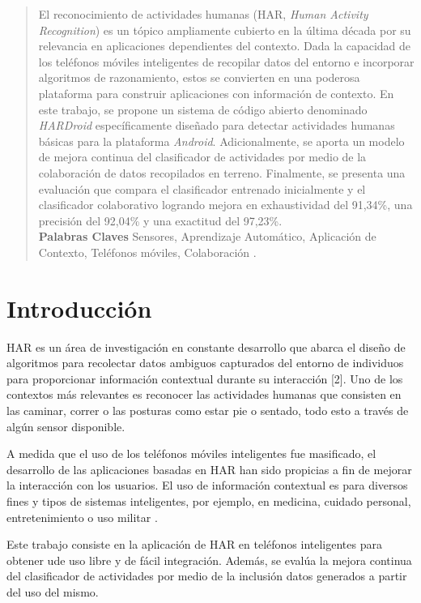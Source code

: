 \documentclass{sciposter}
\begin{document}
\begin{multicols}{3}

\begin{abstract}
El reconocimiento de actividades humanas (HAR, \textit{Human Activity Recognition}) es un tópico ampliamente cubierto en la última década por su relevancia en aplicaciones dependientes del contexto. Dada la capacidad de los teléfonos móviles inteligentes de recopilar datos del entorno e incorporar algoritmos de razonamiento, estos se convierten en una poderosa plataforma para construir aplicaciones con información de contexto. En este trabajo, se propone un sistema de código abierto denominado \textit{HARDroid} específicamente diseñado para detectar actividades humanas básicas para la plataforma \textit{Android}. Adicionalmente, se aporta un modelo de mejora continua del clasificador de actividades por medio de la colaboración de datos recopilados en terreno. Finalmente, se presenta una evaluación que compara el clasificador entrenado inicialmente y el clasificador colaborativo logrando mejora en exhaustividad del 91,34\%, una precisión del 92,04\% y una exactitud del 97,23\%. 
\\
\textbf{Palabras Claves}
Sensores, Aprendizaje Automático, Aplicación de Contexto, Teléfonos móviles, Colaboración .
\end{abstract}

\section{Introducción}

HAR es un área de investigación en constante desarrollo que abarca el diseño de algoritmos para recolectar datos ambiguos capturados del entorno de individuos para proporcionar información contextual durante su interacción [2]. Uno de los contextos más relevantes es reconocer las actividades humanas que consisten en las caminar, correr o las posturas como estar pie o sentado, todo esto a través de algún sensor disponible.

A medida que el uso de los teléfonos móviles inteligentes fue masificado, el desarrollo de las aplicaciones basadas en HAR han sido propicias a fin de mejorar la interacción con los usuarios. El uso de información contextual es para diversos fines y tipos de sistemas inteligentes, por ejemplo, en medicina, cuidado personal, entretenimiento o uso militar \cite{LaraLabrador2013}.

Este trabajo consiste en la aplicación de HAR en teléfonos inteligentes para obtener ude uso libre y de fácil integración. Además, se evalúa la mejora continua del clasificador de actividades por medio de la inclusión datos generados a partir del uso del mismo.


\end{multicols}
\end{document}
